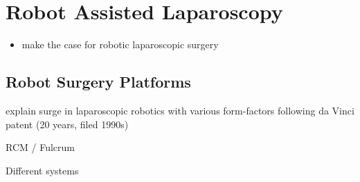 \section{Robot Assisted Laparoscopy}

\begin{itemize}
    \item make the case for robotic laparoscopic surgery
\end{itemize}
\subsection{Robot Surgery Platforms}
explain surge in laparoscopic robotics with various form-factors following da Vinci patent (20 years, filed 1990s)

RCM / Fulcrum

Different systems

